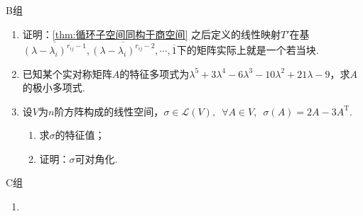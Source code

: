 \centerline{\heiti B组}
\begin{enumerate}
    \item 证明：\autoref{thm:循环子空间同构于商空间} 之后定义的线性映射$T'$在基$\overline{(\lambda-\lambda_i)^{r_{ij}-1}},\overline{(\lambda-\lambda_i)^{r_{ij}-2}},\cdots,\overline{1}$下的矩阵实际上就是一个若当块.
    \item 已知某个实对称矩阵$A$的特征多项式为$\lambda^5+3\lambda^4-6\lambda^3-10\lambda^2+21\lambda-9$，求$A$的极小多项式.
    \item 设$V$为$n$阶方阵构成的线性空间，$\sigma\in \mathcal{L}(V),\enspace \forall A\in V,\enspace \sigma(A)=2A-3A^{\mathrm{T}}$.
          \begin{enumerate}
              \item 求$\sigma$的特征值；
              \item 证明：$\sigma$可对角化.
          \end{enumerate}
\end{enumerate}

\centerline{\heiti C组}
\begin{enumerate}
    \item
\end{enumerate}
